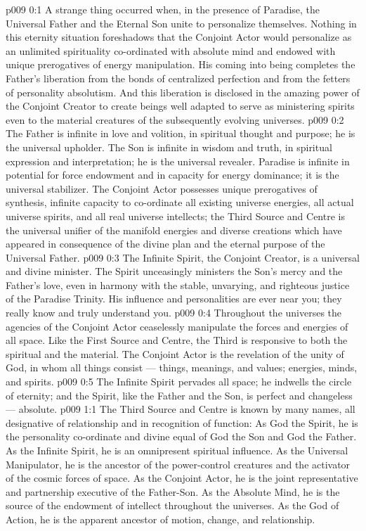 \author{Divine Counsellor}
\vs p009 0:1 A strange thing occurred when, in the presence of Paradise, the Universal Father and the Eternal Son unite to personalize themselves. Nothing in this eternity situation foreshadows that the Conjoint Actor would personalize as an unlimited spirituality co\hyp{}ordinated with absolute mind and endowed with unique prerogatives of energy manipulation. His coming into being completes the Father’s liberation from the bonds of centralized perfection and from the fetters of personality absolutism. And this liberation is disclosed in the amazing power of the Conjoint Creator to create beings well adapted to serve as ministering spirits even to the material creatures of the subsequently evolving universes.
\vs p009 0:2 \pc The Father is infinite in love and volition, in spiritual thought and purpose; he is the universal upholder. The Son is infinite in wisdom and truth, in spiritual expression and interpretation; he is the universal revealer. Paradise is infinite in potential for force endowment and in capacity for energy dominance; it is the universal stabilizer. The Conjoint Actor possesses unique prerogatives of synthesis, infinite capacity to co\hyp{}ordinate all existing universe energies, all actual universe spirits, and all real universe intellects; the Third Source and Centre is the universal unifier of the manifold energies and diverse creations which have appeared in consequence of the divine plan and the eternal purpose of the Universal Father.
\vs p009 0:3 The Infinite Spirit, the Conjoint Creator, is a universal and divine minister. The Spirit unceasingly ministers the Son’s mercy and the Father’s love, even in harmony with the stable, unvarying, and righteous justice of the Paradise Trinity. His influence and personalities are ever near you; they really know and truly understand you.
\vs p009 0:4 Throughout the universes the agencies of the Conjoint Actor ceaselessly manipulate the forces and energies of all space. Like the First Source and Centre, the Third is responsive to both the spiritual and the material. The Conjoint Actor is the revelation of the unity of God, in whom all things consist --- things, meanings, and values; energies, minds, and spirits.
\vs p009 0:5 \pc The Infinite Spirit pervades all space; he indwells the circle of eternity; and the Spirit, like the Father and the Son, is perfect and changeless --- absolute.
\vs p009 1:1 The Third Source and Centre is known by many names, all designative of relationship and in recognition of function: As God the Spirit, he is the personality co\hyp{}ordinate and divine equal of God the Son and God the Father. As the Infinite Spirit, he is an omnipresent spiritual influence. As the Universal Manipulator, he is the ancestor of the power\hyp{}control creatures and the activator of the cosmic forces of space. As the Conjoint Actor, he is the joint representative and partnership executive of the Father\hyp{}Son. As the Absolute Mind, he is the source of the endowment of intellect throughout the universes. As the God of Action, he is the apparent ancestor of motion, change, and relationship.
